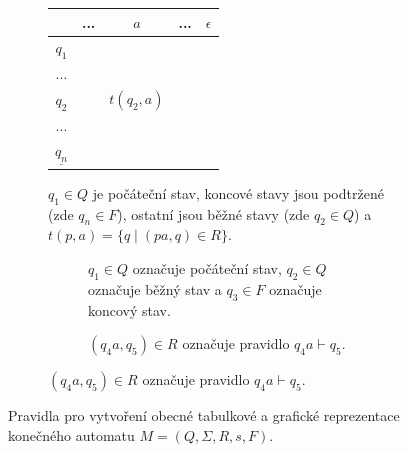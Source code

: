 \begin{figure}[b]
    \centering
    \begin{subfigure}{.5\textwidth}
        \centering
        \begin{tabular}{ |c|c|c|c|c| } 
            \hline
            & ... & $a$ & ... & $\epsilon $ \\ 
            \hline
            $q_1$ &  &  &  & \\ 
            \hline
            ... &  &  &  & \\ 
            \hline
            $q_2$ &  & $t(q_2,a)$  &  & \\ 
            \hline
            ... &  &  &  & \\ 
            \hline
            $ \underline{q_n} $ &  &  &  & \\ 
            \hline
        \end{tabular}
        \caption{$q_1 \in Q $ je počáteční stav, koncové stavy jsou podtržené (zde $q_n \in F $), ostatní jsou běžné stavy (zde $q_2 \in Q $) a $t(p,a)= \{ q \mid (pa,q) \in R \} $.}
        \label{fa_table}
    \end{subfigure}%
    \begin{subfigure}{.5\textwidth}
        \begin{subfigure}{1.0\textwidth}
            \centering
            \caption{$q_1 \in Q$ označuje počáteční stav, $q_2 \in Q$ označuje běžný stav a $q_3 \in F$ označuje koncový stav.}
            \label{fa_graph_1}
        \end{subfigure}%
        \vspace{\floatsep}
        \begin{subfigure}{1.0\textwidth}
            \centering
            \caption{$(q_4a,q_5) \in R$ označuje pravidlo $q_4a \vdash q_5$.}
            \label{fa_graph_2}
        \end{subfigure}
    \end{subfigure}
    \caption{Pravidla pro vytvoření obecné tabulkové a grafické reprezentace konečného automatu $M=(Q, \Sigma ,R,s,F)$.}
    \label{fa_viz}
\end{figure}


